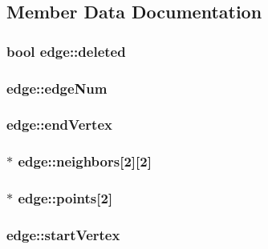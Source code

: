 \subsection{Member Data Documentation}
\hypertarget{classedge_ab63afa3dd5864660c6eaf63958891526}{
\subsubsection[{deleted}]{\setlength{\rightskip}{0pt plus 5cm}bool edge\-::deleted}}\label{classedge_ab63afa3dd5864660c6eaf63958891526}
\hypertarget{classedge_a3ce665ed3d79b2de5f601be06f9b96c4}{
\subsubsection[{edge\-Num}]{ edge\-::edge\-Num}}\label{classedge_a3ce665ed3d79b2de5f601be06f9b96c4}
\hypertarget{classedge_a7395b37cad4750710c5e2c425145df88}{
\subsubsection[{end\-Vertex}]{ edge\-::end\-Vertex}}\label{classedge_a7395b37cad4750710c5e2c425145df88}
\hypertarget{classedge_a532dd309a5dd5e6406eb27853e123745}{
\subsubsection[{neighbors}]{$\ast$ edge\-::neighbors\mbox{[}2\mbox{]}\mbox{[}2\mbox{]}}}\label{classedge_a532dd309a5dd5e6406eb27853e123745}
\hypertarget{classedge_a91c2b7f577f370674bcd10b68359eb76}{
\subsubsection[{points}]{$\ast$ edge\-::points\mbox{[}2\mbox{]}}}\label{classedge_a91c2b7f577f370674bcd10b68359eb76}
\hypertarget{classedge_a62a25ff44fe2c2b73bfa593f0280cd68}{
\subsubsection[{start\-Vertex}]{ edge\-::start\-Vertex}}\label{classedge_a62a25ff44fe2c2b73bfa593f0280cd68}


